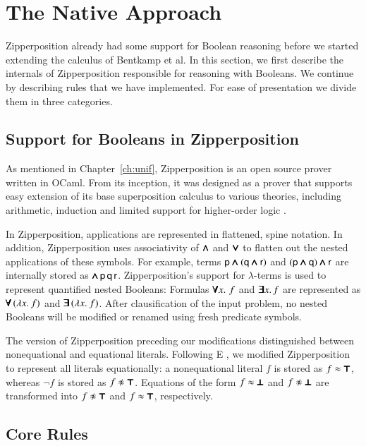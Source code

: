 \section{The Native Approach} 
\label{sect:bool:native}

Zipperposition already had some support for Boolean reasoning before we
started extending the calculus of Bentkamp et al. In this section, we first
describe the internals of Zipperposition responsible for reasoning with
Booleans. We continue by describing  rules that we have
implemented. For ease of presentation we divide them in three categories.
\subsection{Support for Booleans in Zipperposition}
\label{subsect:bool:zip-bools}

As mentioned in Chapter~\ref{ch:unif}, Zipperposition is an open source prover
written in OCaml. From its inception, it was designed as a prover that supports
easy extension of its base superposition calculus to various theories, including
arithmetic, induction and limited support for higher-order logic
\cite{sc-15-simon-phd}.

In Zipperposition, applications are represented in flattened, spine notation. In
addition, Zipperposition uses associativity of $\pmb{\land}$ and $\pmb{\lor}$ to flatten out
the nested applications of these symbols. For example, terms $\mathsf{p} \pmb{\land}
(\mathsf{q} \pmb{\land} \mathsf{r})$ and $(\mathsf{p} \pmb{\land} \mathsf{q}) \pmb{\land} \mathsf{r}$ are
internally stored as $\pmb{\land} \, \mathsf{p} \, \mathsf{q} \, \mathsf{r}$. 
Zipperposition's support for $\lambda$-terms is used to represent quantified nested
Booleans: Formulas $\pmb{\forall} x. \, \, f$ and $\pmb{\exists} x. \, f$ are represented as
$\pmb{\forall} \, (\lambda x.\> f)$ and $\pmb{\exists} \, (\lambda x.\> f)$. After clausification of the
input problem, no nested Booleans will be modified or renamed using fresh
predicate symbols.

The version of Zipperposition preceding our modifications distinguished between non\-equational
and equational literals. Following E \cite{scv-19-e23}, we
modified Zipperposition to represent all literals equationally: a nonequational
literal $f$ is stored as $f \approx \pmb{\top}$, whereas $\neg f$ is stored as $f
\noteq \itrue$. Equations of the form $f \approx \pmb{\bot} $ and $f \noteq \ifalse$ are
transformed into $f \noteq \itrue$ and $f \approx \pmb{\top}$, respectively.

\subsection{Core Rules}
\label{subsect:bool:core}

